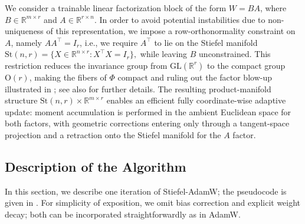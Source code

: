 \documentclass[11pt,a4paper]{article}
\numberwithin{equation}{section}
\newcommand{\algname}{Stiefel-AdamW}
\newcommand{\tr}{^{\top}} %
\newcommand{\Stnr}{\mathrm{St}(n,r)}    %
\newcommand{\R}{\mathbb{R}}
\theoremstyle{plain}
\theoremstyle{definition}
\theoremstyle{remark}
\begin{document}
We consider a trainable linear factorization block of the form $W = BA$,
where $B \in \R^{m \times r}$ and $A \in \R^{r \times n}$. In order to avoid potential instabilities due to non-uniqueness of this representation, we impose a row-orthonormality constraint on $A$, namely $ AA\tr = I_r $, i.e., we require $A\tr$ to lie on the Stiefel manifold $ \Stnr = \{ X \in \R^{n \times r} \colon X\tr\! X = I_r \},$ while leaving $B$ unconstrained. This restriction reduces the invariance group from $\mathrm{GL}(\R^r)$ to the compact group $\mathrm{O}(r)$, making the fibers of $\Phi$ compact and ruling out the factor blow-up illustrated in ; see also  for further details. The resulting product-manifold structure $\Stnr \times \R^{m \times r}$ enables an efficient fully coordinate-wise adaptive update: moment accumulation is performed in the ambient Euclidean space for both factors, with geometric corrections entering only through a tangent-space projection and a retraction onto the Stiefel manifold for the $A$ factor.


\subsection{Description of the Algorithm}
In this section, we describe one iteration of \algname; the pseudocode is given in . For simplicity of exposition, we omit bias correction and explicit weight decay; both can be incorporated straightforwardly as in AdamW.
\end{document}
